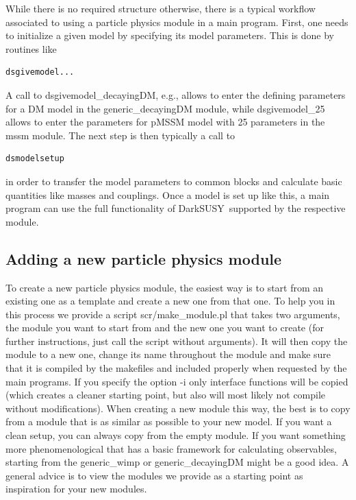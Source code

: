 \documentclass[a4paper,10pt,oneside]{book}
\newcommand{\code}[1]{\ft{#1}}
\newcommand{\ds}{{\sffamily DarkSUSY}}
\newcommand{\ft}[1]{\textsf{#1}}
\begin{document}
While there is no required structure otherwise, there is a typical workflow associated to using
a particle physics module in a main program. First, one needs to initialize a given model
by specifying its model parameters. This is done by routines like
\begin{verbatim}
dsgivemodel...
\end{verbatim}
A call to \code{dsgivemodel\_decayingDM}, e.g., allows to enter the defining parameters for 
a DM model in the \code{generic\_decayingDM} module, while \code{dsgivemodel\_25} allows 
to enter the parameters for pMSSM model with 25 parameters in the \code{mssm} module.
The next step is then typically a call to
\begin{verbatim}
dsmodelsetup
\end{verbatim}
in order to transfer the model parameters to common blocks and calculate basic quantities like
masses and couplings. Once a model is set up like this, a main program can use the full
functionality of \ds\ supported by the respective module.


\subsection{Adding a new particle physics module}


To create a new particle physics module, the easiest way is to start from an existing one as a template 
and create a new one from that one. To help you in this process we provide a script 
\code{scr/make\_module.pl} that takes two arguments, the module you want to start from and 
the new one you 
want to create (for further instructions, just call the script without arguments). 
It will then copy the module to a new one, change its name 
throughout the module and make sure that it is compiled by the makefiles and included properly when 
requested by the main programs. If you specify the option \code{-i} only interface functions will be copied 
(which creates a cleaner starting point, but also will most likely not compile without modifications). When 
creating a new module this way, the best is to copy from a module that is as similar as possible to your 
new model. If you want a clean setup, you can always copy from the \code{empty} module. If you want something more phenomenological that has a basic framework for calculating observables, starting from the \code{generic\_wimp} or \code{generic\_decayingDM} might be a good idea. A general
advice is to view the modules we provide as a starting point as inspiration for your new modules.
\end{document}
